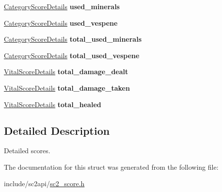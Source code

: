 \begin{DoxyCompactItemize}
\item 
\mbox{\label{structsc2_1_1_score_details_a6533ede42af915b467d858da1e69ec06}} 
\hyperlink{structsc2_1_1_category_score_details}{Category\+Score\+Details} {\bfseries used\+\_\+minerals}
\item 
\mbox{\label{structsc2_1_1_score_details_aac4757a8c44d9b22dd7b570faab06496}} 
\hyperlink{structsc2_1_1_category_score_details}{Category\+Score\+Details} {\bfseries used\+\_\+vespene}
\item 
\mbox{\label{structsc2_1_1_score_details_a5de20a8c62ae9ff6695064b435899150}} 
\hyperlink{structsc2_1_1_category_score_details}{Category\+Score\+Details} {\bfseries total\+\_\+used\+\_\+minerals}
\item 
\mbox{\label{structsc2_1_1_score_details_a95802d4b62fe1b42a86505e1677efbea}} 
\hyperlink{structsc2_1_1_category_score_details}{Category\+Score\+Details} {\bfseries total\+\_\+used\+\_\+vespene}
\item 
\mbox{\label{structsc2_1_1_score_details_a159fcf0c814b80b20bee8b68a84e9d9e}} 
\hyperlink{structsc2_1_1_vital_score_details}{Vital\+Score\+Details} {\bfseries total\+\_\+damage\+\_\+dealt}
\item 
\mbox{\label{structsc2_1_1_score_details_a5ccd1a7da03561a74dde1f3c14182eac}} 
\hyperlink{structsc2_1_1_vital_score_details}{Vital\+Score\+Details} {\bfseries total\+\_\+damage\+\_\+taken}
\item 
\mbox{\label{structsc2_1_1_score_details_af7303a1d1a9a3239f09efc1daccf57fd}} 
\hyperlink{structsc2_1_1_vital_score_details}{Vital\+Score\+Details} {\bfseries total\+\_\+healed}
\end{DoxyCompactItemize}


\subsection{Detailed Description}
Detailed scores. 

The documentation for this struct was generated from the following file\+:\begin{DoxyCompactItemize}
\item 
include/sc2api/\hyperlink{sc2__score_8h}{sc2\+\_\+score.\+h}\end{DoxyCompactItemize}
